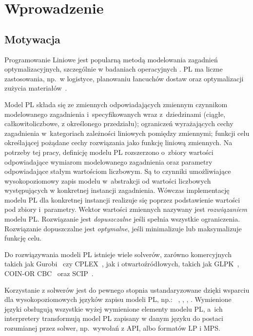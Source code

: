 
\chapter{Wprowadzenie}\label{ch:intro}

\section{Motywacja}\label{sec:intro:motivation}

Programowanie Liniowe  jest popularną metodą modelowania zagadnień optymalizacyjnych, szczególnie w badaniach operacyjnych \cite{williams2013model}. PL ma liczne zastosowania, np.~w logistyce, planowaniu łancuchów dostaw oraz optymalizacji zużycia materiałów~\cite{dantzig2002linear}.

Model PL składa się ze zmiennych odpowiadających zmiennym czynnikom modelowanego zagadnienia i~specyfikowanych wraz z~dziedzinami (ciągłe, całkowitoliczbowe, z określonego przedziału); ograniczeń wyrażających cechy zagadnienia w~kategoriach zależności liniowych pomiędzy zmiennymi; funkcji celu określającej pożądane cechy rozwiązania jako funkcję liniową zmiennych. Na potrzeby tej pracy, definicję modelu PL rozszerzono o~zbiory wartości odpowiadające wymiarom modelowanego zagadnienia oraz parametry odpowiadające stałym wartościom liczbowym. Są to czynniki umożliwiające wysokopoziomowy zapis modelu w~abstrakcji od wartości liczbowych występujących w konkretnej instancji zagadnienia. Wówczas implementację modelu PL dla konkretnej instancji realizuje się poprzez podstawienie wartości pod zbiory i~parametry.
Wektor wartości zmiennych nazywany jest \emph{rozwiązaniem} modelu PL. Rozwiązanie jest \emph{dopuszczalne} jeśli spełnia wszystkie ograniczenia. Rozwiązanie dopuszczalne jest \emph{optymalne}, jeśli minimalizuje lub maksymalizuje funkcję celu.

Do rozwiązywania modeli PL istnieje wiele solverów, zarówno komercyjnych takich jak Gurobi~\cite{gurobi2023} czy CPLEX~\cite{cplex2019}, jak i otwartoźródłowych, takich jak GLPK~\cite{glpk2023}, COIN-OR CBC~\cite{cbc2023} oraz SCIP~\cite{scip2023}. 

Korzystanie z solwerów jest do pewnego stopnia ustandaryzowane dzięki wsparciu dla wysokopoziomowych języków zapisu modeli PL, np.:~ \cite{fourer2003ampl},  \cite{gams2019},  \cite{zimpl_manual},  \cite{nethercote2007minizinc}. Wymienione języki obsługują wszystkie wyżej wymienione elementy modelu PL, a~ich interpretery transformują model PL zapisany w danym języku do postaci rozumianej przez solwer, np.~wywołań z API, albo formatów LP i MPS.

